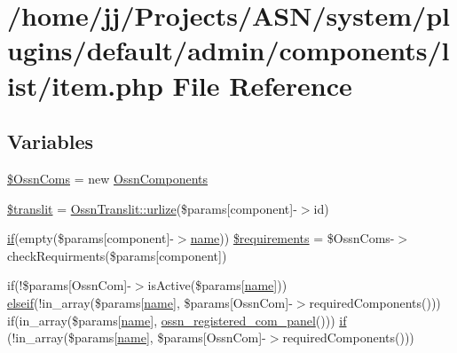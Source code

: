 \hypertarget{system_2plugins_2default_2admin_2components_2list_2item_8php}{}\section{/home/jj/\+Projects/\+A\+S\+N/system/plugins/default/admin/components/list/item.php File Reference}
\label{system_2plugins_2default_2admin_2components_2list_2item_8php}
\subsection*{Variables}
\begin{DoxyCompactItemize}
\item 
\hyperlink{system_2plugins_2default_2admin_2components_2list_2item_8php_a269e9c1471f261d84ee1a4f55bd70853}{\$\+Ossn\+Coms} = new \hyperlink{class_ossn_components}{Ossn\+Components}
\item 
\hyperlink{system_2plugins_2default_2admin_2components_2list_2item_8php_afa48855eba22ae3bb558f75039d92eb6}{\$translit} = \hyperlink{class_ossn_translit_a5913009dee49e11a241b75c9dad52dd2}{Ossn\+Translit\+::urlize}(\$params\mbox{[}\textquotesingle{}component\textquotesingle{}\mbox{]}-\/$>$id)
\item 
\hyperlink{jquery_8tokeninput_8js_ad8dd46a3cbc004569e34401e9e71771a}{if}(empty(\$params\mbox{[}\textquotesingle{}component\textquotesingle{}\mbox{]}-\/$>$\hyperlink{user_8php_a765af5e9671743530143a6d3670fd9a6}{name})) \hyperlink{system_2plugins_2default_2admin_2components_2list_2item_8php_a01270c6ccb33bf873a0aca0e6878fe44}{\$requirements} = \$Ossn\+Coms-\/$>$check\+Requirments(\$params\mbox{[}\textquotesingle{}component\textquotesingle{}\mbox{]})
\item 
if(!\$params\mbox{[}\textquotesingle{}Ossn\+Com\textquotesingle{}\mbox{]}-\/$>$is\+Active(\$params\mbox{[}\textquotesingle{}\hyperlink{user_8php_a765af5e9671743530143a6d3670fd9a6}{name}\textquotesingle{}\mbox{]})) \hyperlink{cache__settings_8php_aac633c7b6b07fcf67f4504fb5c57a856}{elseif}(!in\+\_\+array(\$params\mbox{[}\textquotesingle{}\hyperlink{user_8php_a765af5e9671743530143a6d3670fd9a6}{name}\textquotesingle{}\mbox{]}, \$params\mbox{[}\textquotesingle{}Ossn\+Com\textquotesingle{}\mbox{]}-\/$>$required\+Components())) if(in\+\_\+array(\$params\mbox{[}\textquotesingle{}\hyperlink{user_8php_a765af5e9671743530143a6d3670fd9a6}{name}\textquotesingle{}\mbox{]}, \hyperlink{ossn_8lib_8admin_8php_a87b84149d60316611a878023adecf935}{ossn\+\_\+registered\+\_\+com\+\_\+panel}())) \hyperlink{system_2plugins_2default_2admin_2components_2list_2item_8php_aca419c38bc7ef1362e2f43803b38217c}{if} (!in\+\_\+array(\$params\mbox{[}\textquotesingle{}\hyperlink{user_8php_a765af5e9671743530143a6d3670fd9a6}{name}\textquotesingle{}\mbox{]}, \$params\mbox{[}\textquotesingle{}Ossn\+Com\textquotesingle{}\mbox{]}-\/$>$required\+Components()))

\end{DoxyCompactItemize}
